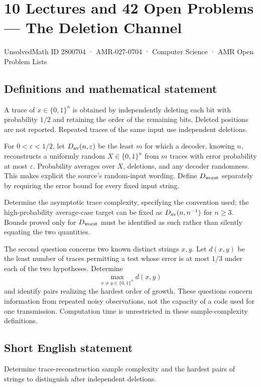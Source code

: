 \documentclass[11pt,a4paper]{article}
\begin{document}
\section*{10 Lectures and 42 Open Problems — The Deletion Channel}\label{2800704}
{\small UnsolvedMath ID 2800704 · AMR-027-0704 · Computer Science · AMR Open Problem Lists}
\subsection{Definitions and mathematical statement}
A trace of $x\in\{0,1\}^n$ is obtained by independently deleting each
bit with probability $1/2$ and retaining the order of the remaining
bits. Deleted positions are not reported. Repeated traces of the
same input use independent deletions.

For $0<\varepsilon<1/2$, let $D_{\rm av}(n,\varepsilon)$ be the
least $m$ for which a decoder, knowing $n$, reconstructs a uniformly
random $X\in\{0,1\}^n$ from $m$ traces with error probability at most
$\varepsilon$. Probability averages over $X$, deletions, and any
decoder randomness. This makes explicit the source's random-input
wording. Define $D_{\rm worst}$ separately by requiring the error bound
for every fixed input string.

Determine the asymptotic trace complexity, specifying the convention
used; the high-probability average-case target can be fixed as
$D_{\rm av}(n,n^{-1})$ for $n\ge3$. Bounds proved only for
$D_{\rm worst}$ must be identified as such rather than silently
equating the two quantities.

The second question concerns two known distinct strings $x,y$.
Let $d(x,y)$ be the least number of traces permitting a test whose
error is at most $1/3$ under each of the two hypotheses. Determine
\[
                  \max_{x\ne y\in\{0,1\}^n}d(x,y)
\]
and identify pairs realizing the hardest order of growth. These
questions concern information from repeated noisy observations, not
the capacity of a code used for one transmission. Computation time is
unrestricted in these sample-complexity definitions.
\subsection{Short English statement}
Determine trace-reconstruction sample complexity and the hardest pairs of strings to distinguish after independent deletions.
\end{document}
